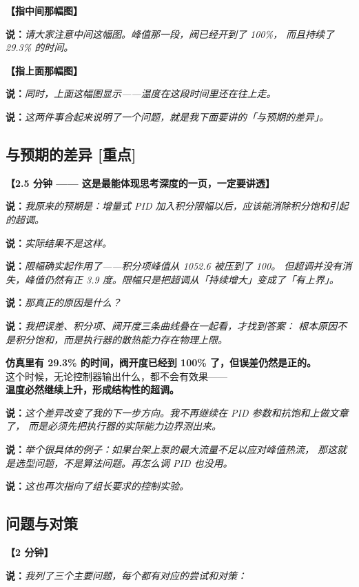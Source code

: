 \documentclass[11pt,a4paper]{ctexart}
\newcommand{\shuo}[1]{\par{\color{cBlue}\bfseries 说：}{\itshape #1}\par}
\newcommand{\dongzuo}[1]{\par{\color{cWarnLine}\bfseries 【#1】}\par}
\begin{document}
\dongzuo{指中间那幅图}

\shuo{请大家注意中间这幅图。峰值那一段，阀已经开到了 100\%，
而且持续了 29.3\% 的时间。}

\dongzuo{指上面那幅图}

\shuo{同时，上面这幅图显示——温度在这段时间里还在往上走。}

\shuo{这两件事合起来说明了一个问题，就是我下面要讲的「与预期的差异」。}

\subsection{与预期的差异 [重点]}

\dongzuo{2.5 分钟 —— 这是最能体现思考深度的一页，一定要讲透}

\shuo{我原来的预期是：增量式 PID 加入积分限幅以后，应该能消除积分饱和引起的超调。}

\shuo{实际结果不是这样。}

\shuo{限幅确实起作用了——积分项峰值从 1052.6 被压到了 100。
但超调并没有消失，峰值仍然有正 3.9 度。限幅只是把超调从「持续增大」变成了「有上界」。}

\shuo{那真正的原因是什么？}

\shuo{我把误差、积分项、阀开度三条曲线叠在一起看，才找到答案：
根本原因不是积分饱和，而是执行器的散热能力存在物理上限。}

\begin{yaodian}
\textbf{仿真里有 29.3\% 的时间，阀开度已经到 100\% 了，但误差仍然是正的。}\\
这个时候，无论控制器输出什么，都不会有效果——\\
\textbf{温度必然继续上升，形成结构性的超调。}
\end{yaodian}

\shuo{这个差异改变了我的下一步方向。我不再继续在 PID 参数和抗饱和上做文章了，
而是必须先把执行器的实际能力边界测出来。}

\shuo{举个很具体的例子：如果台架上泵的最大流量不足以应对峰值热流，
那这就是选型问题，不是算法问题。再怎么调 PID 也没用。}

\shuo{这也再次指向了组长要求的控制实验。}

\subsection{问题与对策}

\dongzuo{2 分钟}

\shuo{我列了三个主要问题，每个都有对应的尝试和对策：}
\end{document}

